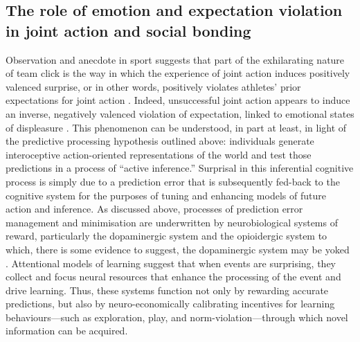 \begin{CJK}{UTF8}{gbsn}

\subsection{The role of emotion and expectation violation in joint action and social bonding}
Observation and anecdote in sport suggests that part of the exhilarating nature of team click is the way in which the experience of joint action induces positively valenced surprise, or in other words, positively violates athletes' prior expectations for joint action \citep{Jackson1999}.  Indeed, unsuccessful joint action appears to induce an inverse, negatively valenced violation of expectation, linked to emotional states of displeasure \citep{Ekkekakis2003}.  This phenomenon can be understood, in part at least, in light of the predictive processing hypothesis outlined above: individuals generate interoceptive action-oriented representations of the world and test those predictions in a process of ``active inference.'' Surprisal in this inferential cognitive process is simply due to a prediction error that is subsequently fed-back to the cognitive system for the purposes of tuning and enhancing models of future action and inference\citep{Clark2013}.
As discussed above, processes of prediction error management and minimisation are underwritten by neurobiological systems of reward, particularly the dopaminergic system \citep{Schultz2013} and the opioidergic system to which, there is some evidence to suggest, the dopaminergic system may be yoked \citep{Pecina2013,Laurent2014}. Attentional models of learning suggest that when events are surprising, they collect and focus neural resources that enhance the processing of the event and drive learning. Thus, these systems function not only by rewarding accurate predictions, but also by neuro-economically calibrating incentives for learning behaviours---such as exploration, play, and norm-violation---through which novel information can be acquired\citep{Little2013}.


\end{CJK}
